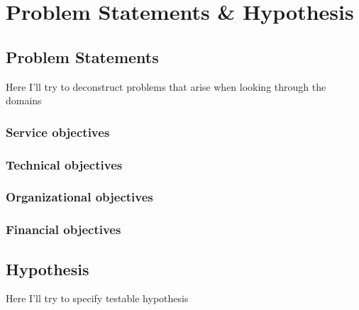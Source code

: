 \documentclass[signatures]{Thesis}
\begin{document}




\tableofcontents
\newpage



\chapter{Problem Statements \& Hypothesis}
\section{Problem Statements}
  	Here I'll try to deconstruct problems that arise when looking through the domains
  	\subsection{Service objectives}
    \subsection{Technical objectives}
    \subsection{Organizational objectives}
    \subsection{Financial objectives}
  \section{Hypothesis}
  	Here I'll try to specify testable hypothesis
\end{document}
